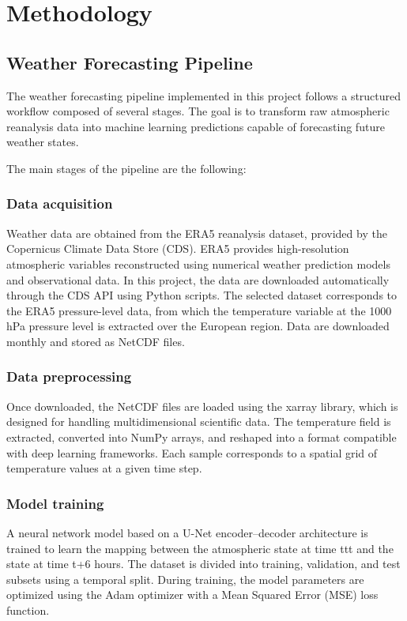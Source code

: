 \chapter{Methodology}
\label{chap:Methodology}

\section{Weather Forecasting Pipeline}
The weather forecasting pipeline implemented in this project follows a structured workflow composed of several stages. The goal is to transform raw atmospheric reanalysis data into machine learning predictions capable of forecasting future weather states.

The main stages of the pipeline are the following:
\subsection{Data acquisition}

Weather data are obtained from the ERA5 reanalysis dataset, provided by the Copernicus Climate Data Store (CDS). ERA5 provides high-resolution atmospheric variables reconstructed using numerical weather prediction models and observational data. In this project, the data are downloaded automatically through the CDS API using Python scripts. The selected dataset corresponds to the ERA5 pressure-level data, from which the temperature variable at the 1000 hPa pressure level is extracted over the European region. Data are downloaded monthly and stored as NetCDF files.

\subsection{Data preprocessing}

Once downloaded, the NetCDF files are loaded using the xarray library, which is designed for handling multidimensional scientific data. The temperature field is extracted, converted into NumPy arrays, and reshaped into a format compatible with deep learning frameworks. Each sample corresponds to a spatial grid of temperature values at a given time step.

\subsection{Model training}

A neural network model based on a U-Net encoder–decoder architecture is trained to learn the mapping between the atmospheric state at time ttt and the state at time t+6 hours. The dataset is divided into training, validation, and test subsets using a temporal split. During training, the model parameters are optimized using the Adam optimizer with a Mean Squared Error (MSE) loss function.

